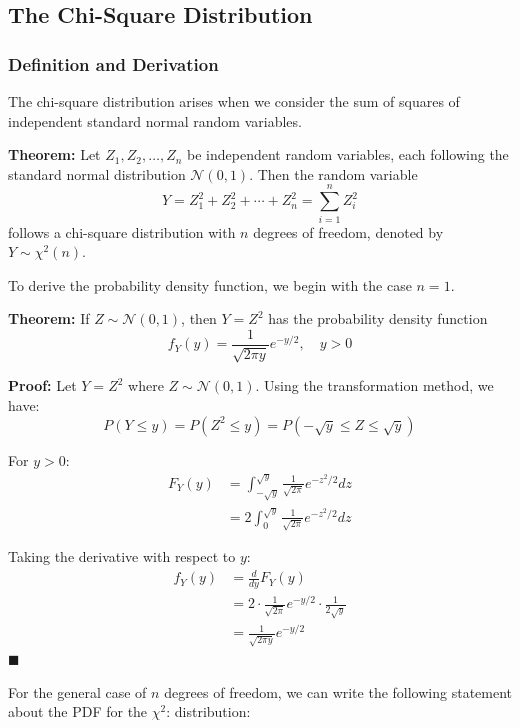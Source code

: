 \documentclass[twoside]{book}
\begin{document}
\subsection{The Chi-Square Distribution}

\subsubsection{Definition and Derivation}

The chi-square distribution arises when we consider the sum of squares of independent standard normal random variables.

\begin{textbox}
\textbf{Theorem:} Let $Z_1, Z_2, \ldots, Z_n$ be independent random variables, each following the standard normal distribution $\mathcal{N}(0,1)$. Then the random variable
$$Y = Z_1^2 + Z_2^2 + \cdots + Z_n^2 = \sum_{i=1}^{n} Z_i^2$$
follows a chi-square distribution with $n$ degrees of freedom, denoted by $Y \sim \chi^2(n)$.
\end{textbox}

To derive the probability density function, we begin with the case $n = 1$.

\begin{textbox}
\textbf{Theorem:} If $Z \sim \mathcal{N}(0,1)$, then $Y = Z^2$ has the probability density function
$$f_Y(y) = \frac{1}{\sqrt{2\pi y}} e^{-y/2}, \quad y > 0$$
\end{textbox}

\textbf{Proof:} Let $Y = Z^2$ where $Z \sim \mathcal{N}(0,1)$. Using the transformation method, we have:
$$P(Y \leq y) = P(Z^2 \leq y) = P(-\sqrt{y} \leq Z \leq \sqrt{y})$$

For $y > 0$:
\begin{align*}
F_Y(y) &= \int_{-\sqrt{y}}^{\sqrt{y}} \frac{1}{\sqrt{2\pi}} e^{-z^2/2} dz\\
&= 2\int_{0}^{\sqrt{y}} \frac{1}{\sqrt{2\pi}} e^{-z^2/2} dz
\end{align*}

Taking the derivative with respect to $y$:
\begin{align*}
f_Y(y) &= \frac{d}{dy} F_Y(y)\\
&= 2 \cdot \frac{1}{\sqrt{2\pi}} e^{-y/2} \cdot \frac{1}{2\sqrt{y}}\\
&= \frac{1}{\sqrt{2\pi y}} e^{-y/2}
\end{align*}
\hfill $\blacksquare$


For the general case of $n$ degrees of freedom, we can write the following statement about the PDF for the $\chi^2$: distribution:
\end{document}
